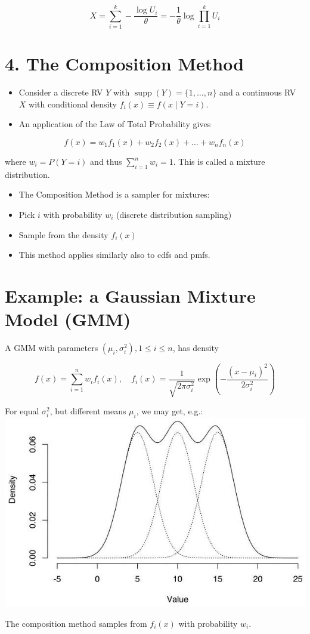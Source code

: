 \documentclass[10pt]{article}
\begin{document}
$$
X=\sum_{i=1}^{k}-\frac{\log U_{i}}{\theta}=-\frac{1}{\theta} \log \prod_{i=1}^{k} U_{i}
$$

\section*{4. The Composition Method}
\begin{itemize}
  \item Consider a discrete RV $Y$ with $\operatorname{supp}(Y)=\{1, \ldots, n\}$ and a continuous RV $X$ with conditional density $f_{i}(x) \equiv f(x \mid Y=i)$.
  \item An application of the Law of Total Probability gives
\end{itemize}

$$
f(x)=w_{1} f_{1}(x)+w_{2} f_{2}(x)+\ldots+w_{n} f_{n}(x)
$$

where $w_{i}=P(Y=i)$ and thus $\sum_{i=1}^{n} w_{i}=1$. This is called a mixture distribution.

\begin{itemize}
  \item The Composition Method is a sampler for mixtures:
  \item Pick $i$ with probability $w_{i}$ (discrete distribution sampling)
  \item Sample from the density $f_{i}(x)$
  \item This method applies similarly also to cdfs and pmfs.
\end{itemize}

\section*{Example: a Gaussian Mixture Model (GMM)}
A GMM with parameters $\left(\mu_{i}, \sigma_{i}^{2}\right), 1 \leq i \leq n$, has density

$$
f(x)=\sum_{i=1}^{n} w_{i} f_{i}(x), \quad f_{i}(x)=\frac{1}{\sqrt{2 \pi \sigma_{i}^{2}}} \exp \left(-\frac{\left(x-\mu_{i}\right)^{2}}{2 \sigma_{i}^{2}}\right)
$$

For equal $\sigma_{i}^{2}$, but different means $\mu_{i}$, we may get, e.g.:\\
\includegraphics[max width=\textwidth, center]{2025_05_12_520db7cd238ba7b44f0fg-46}

The composition method samples from $f_{i}(x)$ with probability $w_{i}$.
\end{document}
